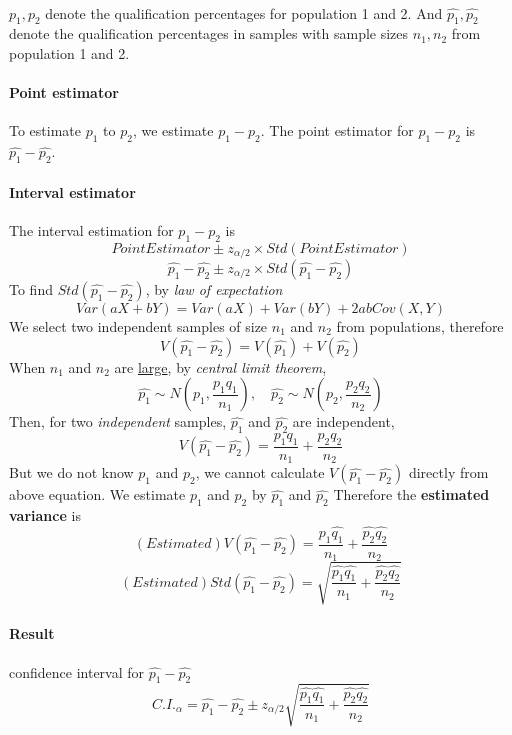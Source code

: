 \documentclass{article}
\begin{document}
			\paragraph{}$p_1, p_2$ denote the qualification percentages for population 1 and 2. And $\hat{p_1}, \hat{p_2}$ denote the qualification percentages in samples with sample sizes
				$n_1, n_2$ from population 1 and 2.
			\paragraph{Point estimator}To estimate $p_1$ to $p_2$, we estimate $p_1 - p_2$.
			The point estimator for $p_1 - p_2$ is $\hat{p_1} - \hat{p_2}$.
			\paragraph{Interval estimator}The interval estimation for $p_1 - p_2$ is 
				\[
					PointEstimator \pm z_{\alpha /2} \times Std(PointEstimator)
				\]
				\[
					\hat{p_1} - \hat{p_2} \pm z_{\alpha /2} \times Std(\hat{p_1} - \hat{p_2})
				\]
				To find $Std(\hat{p_1} - \hat{p_2})$, by \emph{law of expectation}
				\[
					Var(aX+bY) = Var(aX) + Var(bY) + 2abCov(X,Y)
				\]
				We select two independent samples of size $n_1$ and $n_2$ from populations, therefore
				\[
					V(\hat{p_1} - \hat{p_2}) = V(\hat{p_1}) + V(\hat{p_2})
				\]
				When $n_1$ and $n_2$ are \underline{large}, by \emph{central limit theorem}, 
				\begin{displaymath}
					\hat{p_1} \sim N(p_1, \frac{p_1 q_1}{n_1}), \quad
					\hat{p_2} \sim N(p_2, \frac{p_2 q_2}{n_2})
				\end{displaymath}
				Then, for two \emph{independent} samples, $\hat{p_1}$ and $\hat{p_2}$ are independent, 
				\[
					V(\hat{p_1} - \hat{p_2}) = \frac{p_1 q_1}{n_1} + \frac{p_2 q_2}{n_2}
				\]
				But we do not know $p_1$ and $p_2$, we cannot calculate $V(\hat{p_1} - \hat{p_2})$ directly from above equation. We estimate $p_1$ and $p_2$ by $\hat{p_1}$ and $\hat{p_2}$
				\newline Therefore the \textbf{estimated variance} is 
				\[
					(Estimated)V(\hat{p_1} - \hat{p_2}) = \frac{\hat{p_1} \hat{q_1}}{n_1} + \frac{\hat{p_2} \hat{q_2}}{n_2}
				\]
				\[
					(Estimated)Std(\hat{p_1} - \hat{p_2}) = \sqrt{\frac{\hat{p_1} \hat{q_1}}{n_1} + \frac{\hat{p_2} \hat{q_2}}{n_2}}
				\]
		\paragraph{Result} confidence interval for $\hat{p_1} - \hat{p_2}$
			\[
				C.I._{\alpha} = \hat{p_1} - \hat{p_2} \pm z_{\alpha/2} \sqrt{\frac{\hat{p_1} \hat{q_1}}{n_1} + \frac{\hat{p_2} \hat{q_2}}{n_2}}
			\]
\end{document}
